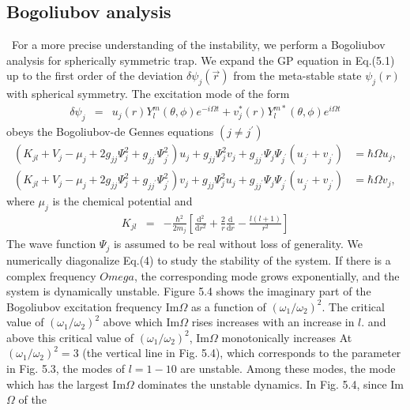 \documentclass[12pt,a4paper]{report}
\newcommand{\diff}{\mathrm{d}}				            %
\begin{document}
\subsection{Bogoliubov analysis}
\ For a more precise understanding of the instability, we perform a 
Bogoliubov analysis for spherically symmetric trap. We expand the
GP equation in Eq.(5.1) up to the first order of the deviation $\delta \psi_j (\vec{r})$
from the meta-stable state $\psi_j(r)$ with spherical symmetry. The excitation mode of the form
\begin{eqnarray}
\delta \psi_j & = & u_j(r)Y_l^m(\theta, \phi)e^{-i \Omega t} + v_j^* (r)Y_l^{m*}(\theta, \phi)e^{i \Omega t}
\end{eqnarray}
obeys the Bogoliubov-de Gennes equations $(j \neq j^\prime)$
\begin{subequations}
\begin{align}
\left(K_{jl} + V_j - \mu_j + 2g_{jj} \Psi^2_j + g_{jj^\prime} \Psi^2_{j^\prime} \right) u_j
+ g_{jj} \Psi^2_j v_j + g_{jj^\prime} \Psi_j \Psi_{j^\prime} (u_{j^\prime} + v_{j^\prime}) 
& = \hbar \Omega u_j,
\\
\left(K_{jl} + V_j - \mu_j + 2g_{jj} \Psi^2_j + g_{jj^\prime} \Psi^2_{j^\prime} \right) v_j
+ g_{jj} \Psi^2_j u_j + g_{jj^\prime} \Psi_j \Psi_{j^\prime} (u_{j^\prime} + v_{j^\prime}) 
& = \hbar \Omega v_j,
\end{align}
\end{subequations}
where $\mu_j$ is the chemical potential and
\begin{eqnarray}
K_{jl} & = & - \frac{\hbar^2}{2m_j} \left[ \frac{\diff^2}{\diff r^2} + \frac{2}{r} \frac{\diff}{\diff r}
- \frac{l(l+1)}{r^2} \right]
\end{eqnarray}
The wave function $\Psi_j$ is assumed to be real without loss of 
generality. We numerically diagonalize Eq.(4) to study the
stability of the system. If there is a complex frequency $Omega$,
the corresponding mode grows exponentially, and the system
is dynamically unstable. Figure 5.4 shows the imaginary part
of the Bogoliubov excitation frequency Im$\Omega$ as a function
of $(\omega_1 / \omega_2)^2$. The critical value of $(\omega_1 / \omega_2)^2$ above which
Im$\Omega$ rises increases with an increase in $l$. and above this
critical value of $(\omega_1 / \omega_2)^2$, Im$\Omega$ monotonically increases At
$(\omega_1 / \omega_2)^2 = 3$ (the vertical line in Fig. 5.4), which corresponds
to the parameter in Fig. 5.3, the modes of $l=1-10$ are unstable.
Among these modes, the mode which has the largest Im$\Omega$
dominates the unstable dynamics. In Fig. 5.4, since Im$\Omega$ of the
\end{document}

